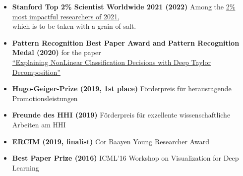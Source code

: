 
\begin{itemize}
    \item [] \textbf{Stanford Top 2\% Scientist Worldwide 2021 (2022)}
    Among the \href{https://elsevier.digitalcommonsdata.com/datasets/btchxktzyw/4}{2\% most impactful researchers of 2021,}\\
    {\vphantom{}\qquad which is to be taken with a grain of salt.}

    \item[] \textbf{Pattern Recognition Best Paper Award and Pattern Recognition Medal (2020)}
    for the paper\\
    \href{https://doi.org/10.1016/j.patcog.2016.11.008}{\qquad ``Explaining NonLinear Classification Decisions with Deep Taylor Decomposition''}

    \item[] \textbf{Hugo-Geiger-Prize (2019, 1st place)}
    F\"orderpreis f\"ur herausragende Promotionsleistungen
    
    \item[] \textbf{Freunde des HHI (2019)}
    F\"orderpreis f\"ur exzellente wissenschaftliche Arbeiten am HHI
    
    \item[] \textbf{ERCIM (2019, finalist)}
    Cor Baayen Young Researcher Award

    \item[] \textbf{Best Paper Prize (2016)}
    ICML'16 Workshop on Visualization for Deep Learning
\end{itemize}
